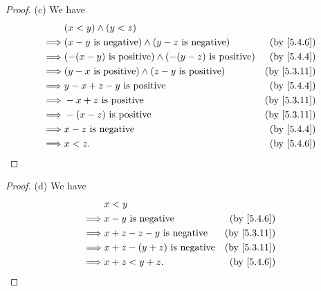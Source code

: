 \begin{proof}{(c)}
  We have
  \begin{align*}
             & (x < y) \land (y < z)                                                                           \\
    \implies & (x - y \text{ is negative}) \land (y - z \text{ is negative})       & \text{(by \cref{5.4.6})}  \\
    \implies & (-(x - y) \text{ is positive}) \land (-(y - z) \text{ is positive}) & \text{(by \cref{5.4.4})}  \\
    \implies & (y - x \text{ is positive}) \land (z - y \text{ is positive})       & \text{(by \cref{5.3.11})} \\
    \implies & y - x + z - y \text{ is positive}                                   & \text{(by \cref{5.4.4})}  \\
    \implies & - x + z \text{ is positive}                                         & \text{(by \cref{5.3.11})} \\
    \implies & -(x - z) \text{ is positive}                                        & \text{(by \cref{5.3.11})} \\
    \implies & x - z \text{ is negative}                                           & \text{(by \cref{5.4.4})}  \\
    \implies & x < z.                                                              & \text{(by \cref{5.4.6})}
  \end{align*}
\end{proof}

\begin{proof}{(d)}
  We have
  \begin{align*}
             & x < y                                                           \\
    \implies & x - y \text{ is negative}           & \text{(by \cref{5.4.6})}  \\
    \implies & x + z - z - y \text{ is negative}   & \text{(by \cref{5.3.11})} \\
    \implies & x + z - (y + z) \text{ is negative} & \text{(by \cref{5.3.11})} \\
    \implies & x + z < y + z.                      & \text{(by \cref{5.4.6})}
  \end{align*}
\end{proof}

